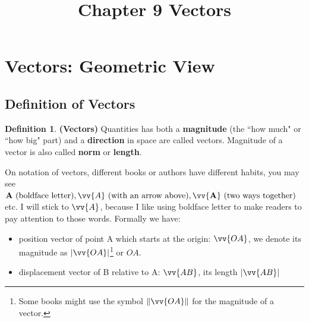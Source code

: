 \documentclass[12pt, a4paper, reqno]{amsart}
\theoremstyle{definition}
\newtheorem{definition}[theorem]{Definition} %
\numberwithin{equation}{section} %
\begin{document}
\title{Chapter 9 Vectors}




%
\maketitle

\section{Vectors: Geometric View}\label{S:VGV}

\subsection{Definition of Vectors}\label{SS:DOV}

\begin{definition}\label{D:VEC} \textbf{(Vectors)}
	Quantities has both a \textbf{magnitude} (the ``how much" or ``how big" part) and a \textbf{direction} in space are called vectors. Magnitude of a vector is also called \textbf{norm} or \textbf{length}.
\end{definition}

On notation of vectors, different books or authors have different habits, you may see $\textbf{A}\text{ (boldface letter)}, \vv{A}\text{ (with an arrow above)}, \vv{\textbf{A}}\text{ (two ways together)}$ etc. I will stick to $\vv{A}$, because I like using boldface letter to make readers to pay attention to those words. Formally we have:
\begin{itemize}
	\item position vector of point A which starts at the origin: $\vv{OA}$, we denote its magnitude as $\left|\vv{OA}\right|$\footnote{Some books might use the symbol $\left\|\vv{OA} \right \|$ for the magnitude of a vector.}\label{f:norm} or $OA$.
	\item displacement vector of B relative to A: $\vv{AB}$, its length $\left|\vv{AB}\right|$
\end{itemize}
\end{document}
